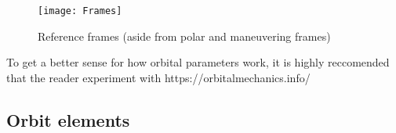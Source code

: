 \documentclass[../main.tex]{subfiles}
\begin{document}
\begin{figure}[H]
    \centering
    \texttt{[image: Frames]}
    \caption{Reference frames (aside from polar and maneuvering frames)}\label{fig:Frames}
\end{figure}

To get a better sense for how orbital parameters work, it is highly reccomended that the reader experiment with https://orbitalmechanics.info/

\bigskip\bigskip
\subsection{Orbit elements}

\begin{comment}
\begin{figure}[H]
    \centering
    \def\SMA{3}
    \def\inc{20}

    \tdplotsetmaincoords{70}{40}
    \begin{tikzpicture}[tdplot_main_coords, >=latex]
        \tdplotsetrotatedcoords{0}{-\inc}{0}

        \draw[lightgray, samples=250, red] plot ({deg(\x)}:\SMA);
        \draw[red, ->] (0,0,0) -- +(\SMA,0,0);
        \draw[red, ->] (0,0,0) -- +(0,0,1);

        \draw[tdplot_rotated_coords, samples=250] plot ({deg(\x)}:\SMA);
        \draw[tdplot_rotated_coords, ->] (0,0,0) -- +(\SMA,0,0);
        \draw[tdplot_rotated_coords, ->] (0,0,0) -- +(0,0,1);

        \filldraw[] (0,\SMA,0) circle (1pt) node[above right, black] {\small DN};
        \filldraw[] (0,-\SMA,0) circle (1pt) node[below left, black] {\small AN};
        \draw[densely dashed] (0,\SMA,0)--(0,-\SMA,0);
        \draw[densely dashed] (2,0,0) arc (0:270:2) node[near end, above] {$\Omega$};

        \draw[tdplot_rotated_coords,gray, densely dashed] (0,0,0) -- +(0,0,2);
        \draw[densely dashed, gray] (0,0,0) -- (0,0,2);
        \tdplotsetrotatedcoords{-90}{90}{90}
        \draw[tdplot_rotated_coords, densely dashed, thick] (0,2,0) arc (90:90+\inc:2) node[midway, above] {$i$};
        \draw[tdplot_rotated_coords, densely dashed, thick] (\SMA,0, 0) arc (0:\inc:\SMA) node[midway, right] {$i$};
    \end{tikzpicture}
    \caption{An orbit with inclination and longitude of ascending node shown}\label{fig:Inclination}
\end{figure}

The inclination $i$ is shown in the above figure, as well as both the ascending and descending nodes. The longitude of ascending node $\Omega$ is shown as well, which in this case is 270 degrees.
\end{comment}
\end{document}
